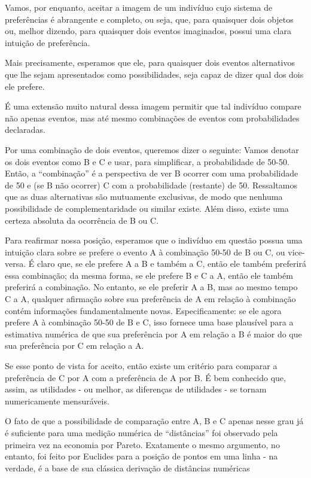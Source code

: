 \documentclass[12pt]{article}
\begin{document}
Vamos, por enquanto, aceitar a imagem de um indivíduo cujo sistema de preferências é abrangente e completo, ou seja, que, para quaisquer dois objetos ou, melhor dizendo, para quaisquer dois eventos imaginados, possui uma clara intuição de preferência.

Mais precisamente, esperamos que ele, para quaisquer dois eventos alternativos que lhe sejam apresentados como possibilidades, seja capaz de dizer qual dos dois ele prefere.

É uma extensão muito natural dessa imagem permitir que tal indivíduo compare não apenas eventos, mas até mesmo combinações de eventos com probabilidades declaradas.

Por uma combinação de dois eventos, queremos dizer o seguinte: Vamos denotar os dois eventos como B e C e usar, para simplificar, a probabilidade de 50-50. Então, a “combinação” é a perspectiva de ver B ocorrer com uma probabilidade de 50 e (se B não ocorrer) C com a probabilidade (restante) de 50. Ressaltamos que as duas alternativas são mutuamente exclusivas, de modo que nenhuma possibilidade de complementaridade ou similar existe. Além disso, existe uma certeza absoluta da ocorrência de B ou C.

Para reafirmar nossa posição, esperamos que o indivíduo em questão possua uma intuição clara sobre se prefere o evento A à combinação 50-50 de B ou C, ou vice-versa. É claro que, se ele prefere A a B e também a C, então ele também preferirá essa combinação; da mesma forma, se ele prefere B e C a A, então ele também preferirá a combinação. No entanto, se ele preferir A a B, mas ao mesmo tempo C a A, qualquer afirmação sobre sua preferência de A em relação à combinação contém informações fundamentalmente novas. Especificamente: se ele agora prefere A à combinação 50-50 de B e C, isso fornece uma base plausível para a estimativa numérica de que sua preferência por A em relação a B é maior do que sua preferência por C em relação a A.

Se esse ponto de vista for aceito, então existe um critério para comparar a preferência de C por A com a preferência de A por B. É bem conhecido que, assim, as utilidades - ou melhor, as diferenças de utilidades - se tornam numericamente mensuráveis.

O fato de que a possibilidade de comparação entre A, B e C apenas nesse grau já é suficiente para uma medição numérica de “distâncias” foi observado pela primeira vez na economia por Pareto. Exatamente o mesmo argumento, no entanto, foi feito por Euclides para a posição de pontos em uma linha - na verdade, é a base de sua clássica derivação de distâncias numéricas
\end{document}
